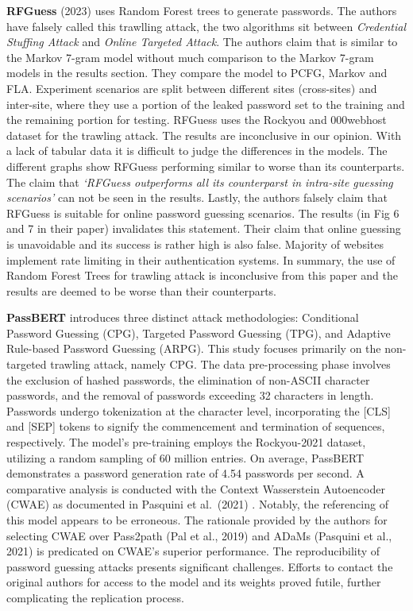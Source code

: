 \textbf{RFGuess} \cite{wang_password_2023} (2023) uses Random Forest
trees to generate passwords. The authors have falsely called this trawlling attack, the two algorithms sit between \textit{Credential Stuffing Attack} and \textit{Online Targeted Attack}. The authors claim that is similar to the
Markov 7-gram model without much comparison to the Markov 7-gram models
in the results section. They compare the model to PCFG, Markov and FLA.
Experiment scenarios are split between different sites (cross-sites) and
inter-site, where they use a portion of the leaked password set to the
training and the remaining portion for testing. RFGuess uses the Rockyou
and 000webhost dataset for the trawling attack. The results are
inconclusive in our opinion. With a lack of tabular data it is difficult
to judge the differences in the models. The different graphs show
RFGuess performing similar to worse than its counterparts. The claim
that \emph{`RFGuess outperforms all its counterparst in intra-site
guessing scenarios'} can not be seen in the results. Lastly, the authors
falsely claim that RFGuess is suitable for online password guessing
scenarios. The results (in Fig 6 and 7 in their paper) invalidates this
statement. Their claim that online guessing is unavoidable and its
success is rather high is also false. Majority of websites implement
rate limiting in their authentication systems. In summary, the use of
Random Forest Trees for trawling attack is inconclusive from this paper
and the results are deemed to be worse than their counterparts.

\textbf{PassBERT} \cite{xu_improving_2023} introduces
three distinct attack methodologies: Conditional Password Guessing
(CPG), Targeted Password Guessing (TPG), and Adaptive Rule-based
Password Guessing (ARPG). This study focuses primarily on the
non-targeted trawling attack, namely CPG. The data pre-processing phase
involves the exclusion of hashed passwords, the elimination of non-ASCII
character passwords, and the removal of passwords exceeding 32
characters in length. Passwords undergo tokenization at the character
level, incorporating the {[}CLS{]} and {[}SEP{]} tokens to signify the
commencement and termination of sequences, respectively. The model's
pre-training employs the Rockyou-2021 dataset, utilizing a random
sampling of 60 million entries. On average, PassBERT demonstrates a
password generation rate of 4.54 passwords per second. A comparative
analysis is conducted with the Context Wasserstein Autoencoder (CWAE) as
documented in Pasquini et al.~(2021)  \cite{pasquini_improving_2021}. Notably, the referencing
of this model appears to be erroneous. The rationale provided by the
authors for selecting CWAE over Pass2path (Pal et al., 2019) \cite{pal_beyond_2019} and ADaMs (Pasquini et al.,
2021) \cite{pasquini_reducing_2021} is predicated on CWAE's
superior performance. The reproducibility of password guessing attacks
presents significant challenges. Efforts to contact the original authors
for access to the model and its weights proved futile, further
complicating the replication process.

